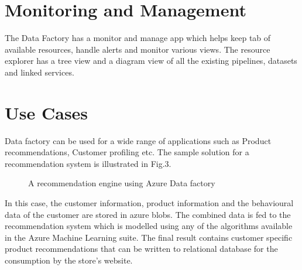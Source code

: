 \documentclass[9pt,twocolumn,twoside]{styles/osajnl}
\begin{document}
\section{Monitoring and Management}
The Data Factory has a monitor and manage app which helps keep tab of available resources, handle alerts and monitor various views. The resource explorer has a tree view and a diagram view of all the existing pipelines, datasets and linked services. ~\cite{www-microsoft-azure-moniter}

\section{Use Cases}
Data factory can be used for a wide range of applications such as Product recommendations, Customer profiling etc. The sample solution for a recommendation system is illustrated in Fig.3.
\begin{figure}[htbp]
\centering
{}
\caption{A recommendation engine using Azure Data factory}
\label{fig:copy-local}
\end{figure}
In this case, the customer information, product information and the behavioural data of the customer are stored in azure blobs. The combined data is fed to the recommendation system which is modelled using any of the algorithms available in the Azure Machine Learning suite. The final result contains customer specific product recommendations that can be written to relational database for the consumption by the store's website.
\end{document}
